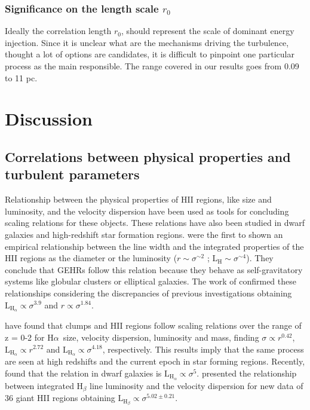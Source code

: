 \documentclass[fleqn,usenatbib, useAMS, a4paper]{mnras}
\newcommand\halpha{H${\alpha}$}
\begin{document}
\subsubsection{Significance on the length scale \(r_0\)}

Ideally the correlation length \(r_0\), should represent the scale of dominant energy injection. 
Since it is unclear what are the mechanisms driving the turbulence, thought a lot of options are candidates, it is difficult to pinpoint one particular process as the main responsible. 
The range covered in our results goes from 0.09 to 11 pc.


\section{Discussion}\label{sec:discussion}

\subsection{Correlations between physical properties and turbulent parameters}

Relationship between the physical properties of HII regions, like size and luminosity, and the velocity dispersion have been used as tools for concluding scaling relations for these objects.
These relations have also been studied in dwarf galaxies and high-redshift star formation regions.
\citet{melnick1977,terlevich1981} were the first to shown an empirical relationship between the line width and the integrated properties of the HII regions as the diameter or the luminosity ($r \sim \sigma ^{\sim 2}$ ; $\text{L}_{\text{H}} \sim \sigma ^{\sim 4}$).
They conclude that GEHRs follow this relation because they behave as self-gravitatory systems like globular clusters or elliptical galaxies.
The work of \citet{1988A&A...201..199A} confirmed these relationships considering the discrepancies of previous investigations obtaining \(\text{L}_{\text{H}_{\alpha}} \propto \sigma^{3.9}\) and \(r \propto \sigma^{1.84}\).



\citet{2012MNRAS.422.3339W} have found that clumps and HII regions follow scaling relations over the range of z = 0-2 for \halpha\ size, velocity dispersion, luminosity and mass, finding \(\sigma \propto r^{0.42}\), \(\text{L}_{\text{H}_{\alpha}} \propto r^{2.72}\) and \(\text{L}_{\text{H}_{\alpha}} \propto \sigma^{4.18}\), respectively. 
This results imply that the same process are seen at high redshifts and the current epoch in star forming regions.
Recently, \citet{Moiseev:2015a} found that the relation in dwarf galaxies is \(\text{L}_{\text{H}_{\alpha}} \propto \sigma^{5}\).
\citet{2018MNRAS.474.1250F} presented the relationship between integrated H$_{\beta}$ line luminosity and the velocity dispersion for new data of 36 giant HII regions obtaining \(\text{L}_{\text{H}_{\beta}} \propto \sigma^{5.02 \pm 0.21}\).
\end{document}

